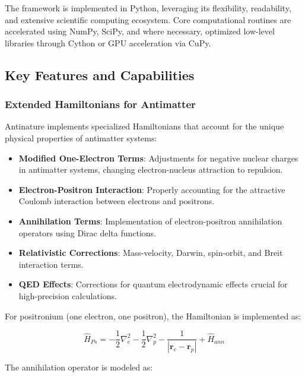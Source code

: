 \documentclass[10pt,twocolumn,a4paper]{article}
\begin{document}
The framework is implemented in Python, leveraging its flexibility, readability, and extensive scientific computing ecosystem. Core computational routines are accelerated using NumPy, SciPy, and where necessary, optimized low-level libraries through Cython or GPU acceleration via CuPy.

\subsection{Key Features and Capabilities}

\subsubsection{Extended Hamiltonians for Antimatter}
Antinature implements specialized Hamiltonians that account for the unique physical properties of antimatter systems:

\begin{itemize}
    \item \textbf{Modified One-Electron Terms}: Adjustments for negative nuclear charges in antimatter systems, changing electron-nucleus attraction to repulsion.
    
    \item \textbf{Electron-Positron Interaction}: Properly accounting for the attractive Coulomb interaction between electrons and positrons.
    
    \item \textbf{Annihilation Terms}: Implementation of electron-positron annihilation operators using Dirac delta functions.
    
    \item \textbf{Relativistic Corrections}: Mass-velocity, Darwin, spin-orbit, and Breit interaction terms.
    
    \item \textbf{QED Effects}: Corrections for quantum electrodynamic effects crucial for high-precision calculations.
\end{itemize}

For positronium (one electron, one positron), the Hamiltonian is implemented as:

\begin{equation}
    \hat{H}_{Ps} = -\frac{1}{2}\nabla_e^2 - \frac{1}{2}\nabla_p^2 - \frac{1}{|\textbf{r}_e - \textbf{r}_p|} + \hat{H}_{ann}
\end{equation}

The annihilation operator is modeled as:
\end{document}

